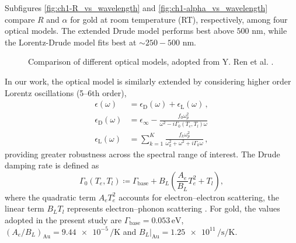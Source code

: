 Subfigures \ref{fig:ch1-R_vs_wavelength} and \ref{fig:ch1-alpha_vs_wavelength} compare $R$ and $\alpha$ for gold at room temperature (RT), respectively, among four optical models.
The extended Drude model performs best above $500$ nm, while the Lorentz-Drude model fits best at $\sim 250-500$ nm.

\begin{figure}
  \centering
  \caption{Comparison of different optical models, adopted from Y. Ren et al. \cite{Ren_2011}.} %
  \label{fig:reflectivity-plots} %
\end{figure}

In our work, the optical model is similarly extended by considering higher order Lorentz oscillations (5--6th order),
\begin{align}
  \epsilon(\omega)              & = \epsilon_{\mathrm{D}}(\omega) + \epsilon_{\mathrm{L}}(\omega) \, , \nonumber        \\
  \epsilon_{\mathrm{D}}(\omega) & = \epsilon_\infty -  \frac{f_0 \omega_p^2}{\omega^2 - i \Gamma_0(T_e, T_l) \omega}    \\
  \epsilon_{\mathrm{L}}(\omega) & = \sum_{k=1}^{K} \frac{f_k \omega_p^2}{\omega_k^2 + \omega^2 + i\Gamma_k \omega} \, ,
  \label{eq:ch1-lorentz-drude}
\end{align}
providing greater robustness across the spectral range of interest.
The Drude damping rate is defined as
\begin{equation}
  \Gamma_0(T_e, T_l)
  \coloneqq
  \Gamma_{\mathrm{base}}
  +
  B_L\!\left(
  \frac{A_e}{B_L} T_e^2 + T_l
  \right),
  \label{eq:ch1-drude-damping}
\end{equation}
where the quadratic term \(A_e T_e^2\) accounts for electron--electron
scattering, the linear term \(B_L T_l\) represents electron--phonon
scattering \cite[\S~II.C]{Lin_2008}.
For gold, the values adopted in the present study are
\(\Gamma_\mathrm{base} = \num{0.053}\,\si{\eV}\),
\((A_e/B_L)_{\mathrm{Au}} = \num{9.44e-5}\,\si{\per\kelvin}\) and
\(B_L|_{\mathrm{Au}} = \num{1.25e11}\,\si{\per\second\per\kelvin}\).

